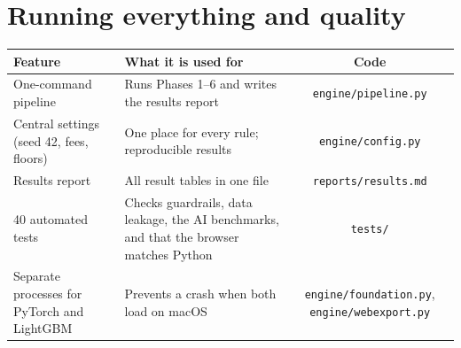 \documentclass[10pt,a4paper]{article}
\newcommand{\code}[1]{\texttt{\small #1}}
\begin{document}
\section{Running everything and quality}
\begin{xltabular}{\linewidth}{F U C}
\toprule \textbf{Feature} & \textbf{What it is used for} & \textbf{Code} \\ \midrule \endhead
One-command pipeline & Runs Phases 1--6 and writes the results report & \code{engine/pipeline.py} \\
Central settings (seed 42, fees, floors) & One place for every rule; reproducible results & \code{engine/config.py} \\
Results report & All result tables in one file & \code{reports/results.md} \\
40 automated tests & Checks guardrails, data leakage, the AI benchmarks, and that the browser matches Python & \code{tests/} \\
Separate processes for PyTorch and LightGBM & Prevents a crash when both load on macOS & \code{engine/foundation.py}, \code{engine/webexport.py} \\
\bottomrule
\end{xltabular}
\end{document}
